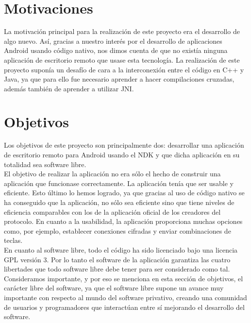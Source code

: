 \section{Motivaciones}

La motivación principal para la realización de este proyecto era el desarrollo de algo nuevo. Así, gracias a nuestro interés por el desarrollo de aplicaciones Android usando código nativo, nos dimos cuenta de que no existía ninguna aplicación de escritorio remoto que usase esta tecnología. La realización de este proyecto suponía un desafío de cara a la interconexión entre el código en C++ y Java, ya que para ello fue necesario aprender a hacer compilaciones cruzadas, además también de aprender a utilizar JNI.

\section{Objetivos}

Los objetivos de este proyecto son principalmente dos: desarrollar una aplicación de escritorio remoto para Android usando el NDK y que dicha aplicación en su totalidad sea software libre.\\

El objetivo de realizar la aplicación no era sólo el hecho de construir una aplicación que funcionase correctamente. La aplicación tenía que ser usable y eficiente. Esto último lo hemos logrado, ya que gracias al uso de código nativo se ha conseguido que la aplicación, no sólo sea eficiente sino que tiene niveles de eficiencia comparables con los de la aplicación oficial de los creadores del protocolo. En cuanto a la usabilidad, la aplicación proporciona muchas opciones como, por ejemplo, establecer conexiones cifradas y enviar combinaciones de teclas.\\

En cuanto al software libre, todo el código ha sido licenciado bajo una licencia GPL versión 3. Por lo tanto el software de la aplicación garantiza las cuatro libertades que todo software libre debe tener para ser considerado como tal.\\

Consideramos importante, y por eso se menciona en esta sección de objetivos, el carácter libre del software, ya que el software libre supone un avance muy importante con respecto al mundo del software privativo, creando una comunidad de usuarios y programadores que interactúan entre sí mejorando el desarrollo del software.
